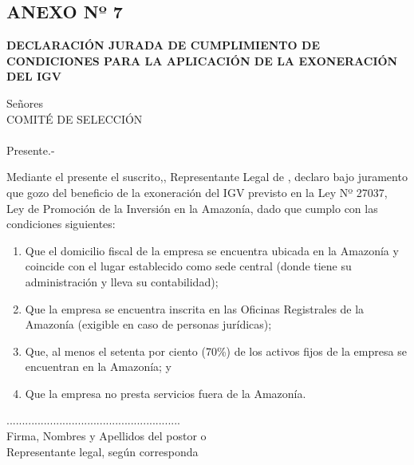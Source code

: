 \begin{center}
    \section*{ANEXO Nº 7 } 
    \textbf{DECLARACIÓN JURADA DE CUMPLIMIENTO DE CONDICIONES PARA LA APLICACIÓN DE LA EXONERACIÓN DEL IGV}
    \end{center}
    
    Señores \\
    COMITÉ DE SELECCIÓN \\
    \nomenclatura \\
    Presente.-
    
    \vspace{0.5cm}
    
    Mediante el presente el suscrito,\representante, Representante Legal de \empresa, declaro bajo juramento que gozo del beneficio de la exoneración del IGV previsto en la Ley Nº 27037, Ley de Promoción de la Inversión en la Amazonía, dado que cumplo con las condiciones siguientes:
    
    \begin{enumerate}
        \item Que el domicilio fiscal de la empresa  se encuentra ubicada en la Amazonía y coincide con 	el lugar establecido como sede central (donde tiene su administración y lleva su contabilidad);
    
        \item Que la empresa se encuentra inscrita en las Oficinas Registrales de la Amazonía (exigible en caso de personas jurídicas);
    
        \item Que, al menos el setenta por ciento (70\%) de los activos fijos de la empresa se encuentran en la Amazonía; y
    
        \item Que la empresa no presta servicios fuera de la Amazonía.
    
    \end{enumerate}
    
    \vspace{0.5cm}
    
    \fecha 
    
    \vspace{2cm}
    
    \begin{center}
    ........................................................\\
    Firma, Nombres y Apellidos del postor o \\ 
    Representante legal, según corresponda
    \end{center}